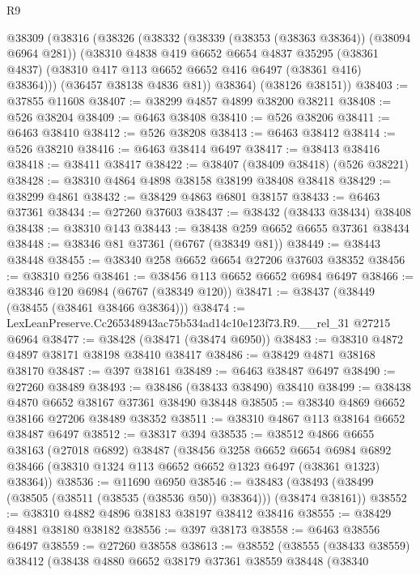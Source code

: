 \begin{lexlean}{R9}
\begin{coremodule}
    @38309
      (@38316
        (@38326
          (@38332
            (@38339 (@38353 (@38363 @38364)) (@38094 @6964 @281))
            (@38310
              @4838
              @419
              @6652
              @6654
              @4837
              @35295
              (@38361 @4837)
              (@38310 @417 @113 @6652 @6652 @416 @6497 (@38361 @416) @38364)))
          (@36457 @38138 @4836 @81))
        @38364)
      (@38126 @38151))
@38403 := @37855 @11608
@38407 := @38299 @4857 @4899 @38200 @38211
@38408 := @526 @38204
@38409 := @6463 @38408
@38410 := @526 @38206
@38411 := @6463 @38410
@38412 := @526 @38208
@38413 := @6463 @38412
@38414 := @526 @38210
@38416 := @6463 @38414 @6497
@38417 := @38413 @38416
@38418 := @38411 @38417
@38422 := @38407 (@38409 @38418) (@526 @38221)
@38428 := @38310 @4864 @4898 @38158 @38199 @38408 @38418
@38429 := @38299 @4861
@38432 := @38429 @4863 @6801 @38157
@38433 := @6463 @37361
@38434 := @27260 @37603
@38437 := @38432 (@38433 @38434) @38408
@38438 := @38310 @143
@38443 := @38438 @259 @6652 @6655 @37361 @38434
@38448 := @38346 @81 @37361 (@6767 (@38349 @81))
@38449 := @38443 @38448
@38455 := @38340 @258 @6652 @6654 @27206 @37603 @38352
@38456 := @38310 @256
@38461 := @38456 @113 @6652 @6652 @6984 @6497
@38466 := @38346 @120 @6984 (@6767 (@38349 @120))
@38471 := @38437 (@38449 (@38455 (@38461 @38466 @38364)))
@38474 := LexLeanPreserve.Cc265348943ac75b534ad14c10e123f73.R9.__rel_31 @27215 @6964
@38477 := @38428 (@38471 (@38474 @6950))
@38483 := @38310 @4872 @4897 @38171 @38198 @38410 @38417
@38486 := @38429 @4871 @38168 @38170
@38487 := @397 @38161
@38489 := @6463 @38487 @6497
@38490 := @27260 @38489
@38493 := @38486 (@38433 @38490) @38410
@38499 := @38438 @4870 @6652 @38167 @37361 @38490 @38448
@38505 := @38340 @4869 @6652 @38166 @27206 @38489 @38352
@38511 := @38310 @4867 @113 @38164 @6652 @38487 @6497
@38512 := @38317 @394
@38535 := @38512
    @4866
    @6655
    @38163
    (@27018 @6892)
    @38487
    (@38456
      @3258
      @6652
      @6654
      @6984
      @6892
      @38466
      (@38310 @1324 @113 @6652 @6652 @1323 @6497 (@38361 @1323) @38364))
@38536 := @11690 @6950
@38546 := @38483 (@38493 (@38499 (@38505 (@38511 (@38535 (@38536 @50)) @38364))) (@38474 @38161))
@38552 := @38310 @4882 @4896 @38183 @38197 @38412 @38416
@38555 := @38429 @4881 @38180 @38182
@38556 := @397 @38173
@38558 := @6463 @38556 @6497
@38559 := @27260 @38558
@38613 := @38552
    (@38555
      (@38433 @38559)
      @38412
      (@38438
        @4880
        @6652
        @38179
        @37361
        @38559
        @38448
        (@38340

\end{coremodule}
\end{lexlean}
